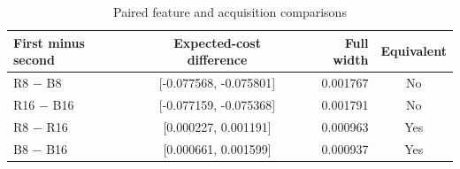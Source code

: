 \begin{table}[htbp]\centering
\caption{Paired feature and acquisition comparisons}\label{tab:pairs77}
{\small\setlength{\tabcolsep}{4pt}\begin{tabular}{lcrc}
\toprule
First minus second & Expected-cost difference & Full width & Equivalent \\
\midrule
R8 $-$ B8 & [-0.077568, -0.075801] & 0.001767 & No \\
R16 $-$ B16 & [-0.077159, -0.075368] & 0.001791 & No \\
R8 $-$ R16 & [0.000227, 0.001191] & 0.000963 & Yes \\
B8 $-$ B16 & [0.000661, 0.001599] & 0.000937 & Yes \\
\bottomrule\end{tabular}}
\par{}
\end{table}
